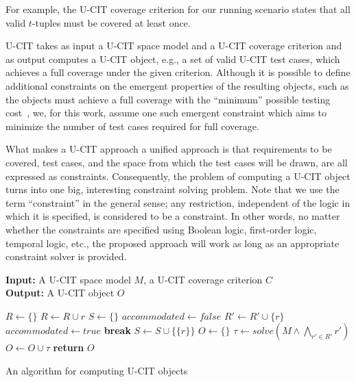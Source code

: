 \documentclass[EPiCempty]{easychair}
\begin{document}
For example, the U-CIT coverage criterion for our running scenario states that all valid $t$-tuples must be covered at least once.

U-CIT takes as input a U-CIT space model and a U-CIT coverage criterion and as output computes a U-CIT object, e.g., a set of valid U-CIT test cases, which achieves a full coverage under the given criterion. Although it is possible to define additional constraints on the emergent properties of the resulting objects, such as the objects must achieve a full coverage with the ``minimum'' possible testing cost~\cite{demiroz2012cost}, we, for this work, assume one such emergent constraint which aims to minimize the number of test cases required for full coverage.
 
What makes a U-CIT approach a unified approach is that requirements to be covered, test cases, and the space from which the test cases will be drawn, are all expressed as constraints. Consequently, the problem of computing a U-CIT object turns into one big, interesting constraint solving  problem. Note that we use the term ``constraint'' in the general sense; any restriction, independent of the logic in which it is specified, is considered to be a constraint. In other words, no matter whether the constraints are specified using Boolean logic, first-order logic, temporal logic, etc., the proposed approach will work as long as an appropriate constraint solver is provided.

\begin{algorithm}[t]
{\bf Input:} A U-CIT space model $M$,  a U-CIT coverage criterion $C$ \\
{\bf Output:} A U-CIT object $O$ \\ 
\vspace*{-0.5cm}
\begin{algorithmic}[1]
\State $R \leftarrow \{\}$
   \State $R \leftarrow R \cup r$
   \EndIf
\EndFor 
\State 
{}
\State $S \leftarrow \{\}$  
	\State $accommodated \leftarrow false$
			\State $R' \leftarrow R' \cup \{r\}$
			\State $accommodated \leftarrow true$
			\State \textbf{break}
		\EndIf			\EndFor
	    \State $S \leftarrow S \cup \{\{r\}\}$     
	\EndIf		
\EndFor
\State 
{}
\State $O \leftarrow \{\}$  
    \State $\tau \leftarrow solve(M \wedge \bigwedge_{r' \in R'} r')$
    \State $O \leftarrow O \cup \tau$
\EndFor
\State \textbf{return} $O$ 
\end{algorithmic}
\caption{An algorithm for computing U-CIT objects}
\label{algo:approach1}
\end{algorithm}
\end{document}
